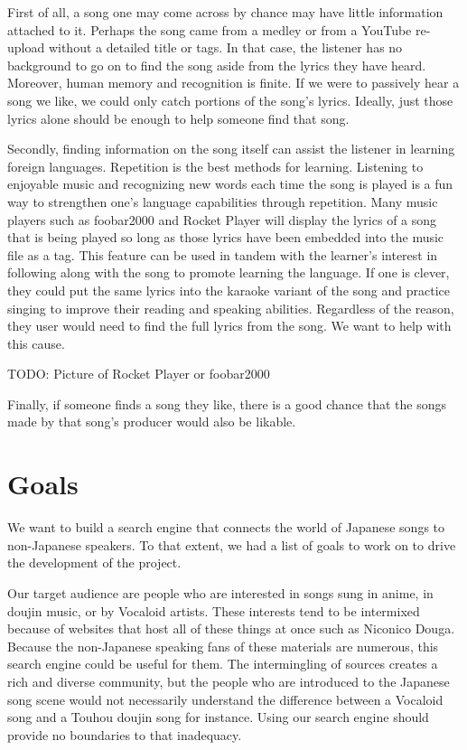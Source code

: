 \documentclass{acm} %
\begin{document}
\begin{CJK}{UTF8}{zhsong}
First of all, a song one may come across by chance may have little information attached to it. Perhaps the song came from a medley or from a YouTube re-upload without a detailed title or tags. In that case, the listener has no background to go on to find the song aside from the lyrics they have heard. Moreover, human memory and recognition is finite. If we were to passively hear a song we like, we could only catch portions of the song's lyrics. Ideally, just those lyrics alone should be enough to help someone find that song.

Secondly, finding information on the song itself can assist the listener in learning foreign languages. Repetition is the best methods for learning. Listening to enjoyable music and recognizing new words each time the song is played is a fun way to strengthen one's language capabilities through repetition. Many music players such as foobar2000 and Rocket Player will display the lyrics of a song that is being played so long as those lyrics have been embedded into the music file as a tag. This feature can be used in tandem with the learner's interest in following along with the song to promote learning the language. If one is clever, they could put the same lyrics into the karaoke variant of the song and practice singing to improve their reading and speaking abilities. Regardless of the reason, they user would need to find the full lyrics from the song. We want to help with this cause.

TODO: Picture of Rocket Player or foobar2000

Finally, if someone finds a song they like, there is a good chance that the songs made by that song's producer would also be likable. 

\section{Goals}

We want to build a search engine that connects the world of Japanese songs to non-Japanese speakers. To that extent, we had a list of goals to work on to drive the development of the project.

Our target audience are people who are interested in songs sung in anime, in doujin music, or by Vocaloid artists. These interests tend to be intermixed because of websites that host all of these things at once such as Niconico Douga. Because the non-Japanese speaking fans of these materials are numerous, this search engine could be useful for them. The intermingling of sources creates a rich and diverse community, but the people who are introduced to the Japanese song scene would not necessarily understand the difference between a Vocaloid song and a Touhou doujin song for instance. Using our search engine should provide no boundaries to that inadequacy.


\end{CJK}
\end{document}
